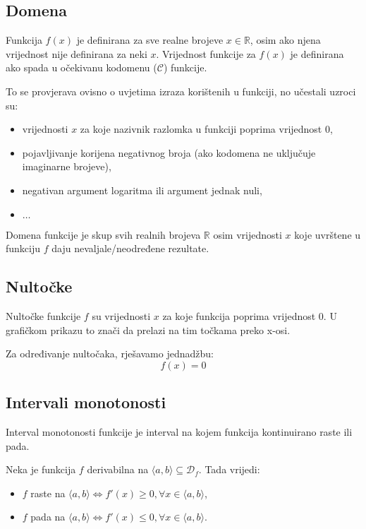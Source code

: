 \subsection{Domena}

Funkcija $f(x)$ je definirana za sve realne brojeve $x\in\mathbb{R}$, osim ako
njena vrijednost nije definirana za neki $x$. Vrijednost funkcije za $f(x)$ je
definirana ako spada u očekivanu kodomenu ($\mathcal{C}$) funkcije.

To se provjerava ovisno o uvjetima izraza korištenih u funkciji, no učestali
uzroci su:
\begin{itemize}
    \item vrijednosti $x$ za koje nazivnik razlomka u funkciji poprima vrijednost $0$,
    \item pojavljivanje korijena negativnog broja (ako kodomena ne uključuje imaginarne brojeve),
    \item negativan argument logaritma ili argument jednak nuli,
    \item $\dots$
\end{itemize}

\noindent
Domena funkcije je skup svih realnih brojeva $\mathbb{R}$ osim vrijednosti $x$
koje uvrštene u funkciju $f$ daju nevaljale/neodređene rezultate.

\subsection{Nultočke}

Nultočke funkcije $f$ su vrijednosti $x$ za koje funkcija poprima vrijednost $0$.
U grafičkom prikazu to znači da prelazi na tim točkama preko x-osi.

Za određivanje nultočaka, rješavamo jednadžbu:
$$
f(x) = 0
$$

\subsection{Intervali monotonosti}

Interval monotonosti funkcije je interval na kojem funkcija kontinuirano raste
ili pada.

\begin{theorem}
    Neka je funkcija $f$ derivabilna na $\langle a,b \rangle \subseteq \mathcal{D}_f$.
    Tada vrijedi:
    \begin{itemize}
        \item $f$ raste na $\langle a,b \rangle \Leftrightarrow f'(x) \geq 0, \forall x \in \langle a,b \rangle$,
        \item $f$ pada na $\langle a,b \rangle \Leftrightarrow f'(x) \leq 0, \forall x \in \langle a,b \rangle$.
    \end{itemize}
\end{theorem}

